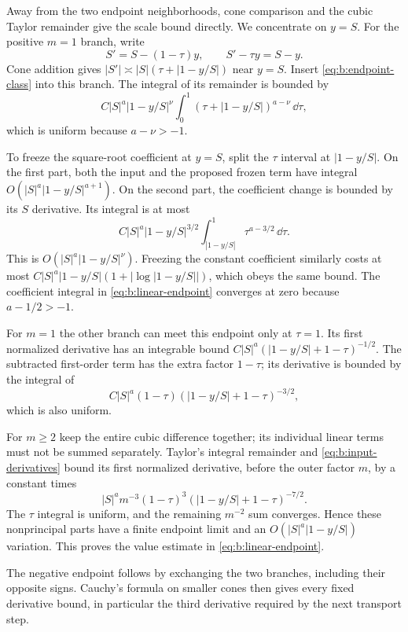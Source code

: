 \begin{prf}
Away from the two endpoint neighborhoods, cone comparison and the
cubic Taylor remainder give the scale bound directly. We concentrate
on $y=S$.
For the positive $m=1$ branch, write
\[
 S'=S-(1-\tau)y,\qquad
 S'-\tau y=S-y.
\]
Cone addition gives
$|S'|\asymp |S|(\tau+|1-y/S|)$ near $y=S$.
Insert \eqref{eq:b:endpoint-class} into this branch. The integral
of its remainder is bounded by
\[
 C|S|^a|1-y/S|^\nu
       \int_0^1(\tau+|1-y/S|)^{a-\nu}\,\dd\tau,
\]
which is uniform because $a-\nu>-1$.

To freeze the square-root coefficient at $y=S$, split the
$\tau$ interval at $|1-y/S|$. On the first part, both the input
and the proposed frozen term have integral
$O(|S|^a|1-y/S|^{a+1})$. On the second part, the coefficient
change is bounded by its $S$ derivative. Its integral is at most
\[
 C|S|^a|1-y/S|^{3/2}
      \int_{|1-y/S|}^1\tau^{a-3/2}\,\dd\tau.
\]
This is $O(|S|^a|1-y/S|^\nu)$. Freezing the constant coefficient
similarly costs at most
$C|S|^a|1-y/S|(1+|\log|1-y/S||)$, which obeys the same bound.
The coefficient integral in \eqref{eq:b:linear-endpoint} converges
at zero because $a-1/2>-1$.

For $m=1$ the other branch can meet this endpoint only at
$\tau=1$. Its first normalized derivative has an integrable bound
$C|S|^a(|1-y/S|+1-\tau)^{-1/2}$.
The subtracted first-order term has the extra factor $1-\tau$;
its derivative is bounded by the integral of
\[
 C|S|^a(1-\tau)
                  (|1-y/S|+1-\tau)^{-3/2},
\]
which is also uniform.

For $m\geq2$ keep the entire cubic
difference together; its individual linear terms must not be
summed separately. Taylor's integral remainder and
\eqref{eq:b:input-derivatives} bound its first normalized derivative,
before the outer factor $m$, by a constant times
\[
 |S|^a m^{-3}(1-\tau)^3
                  (|1-y/S|+1-\tau)^{-7/2}.
\]
The $\tau$ integral is uniform, and the remaining $m^{-2}$ sum
converges. Hence these nonprincipal parts have a finite endpoint
limit and an $O(|S|^a|1-y/S|)$ variation. This proves the value
estimate in \eqref{eq:b:linear-endpoint}.

The negative endpoint
follows by exchanging the two branches, including their opposite
signs. Cauchy's formula on smaller cones then gives every fixed
derivative bound, in particular the third derivative required by
the next transport step.
\end{prf}

